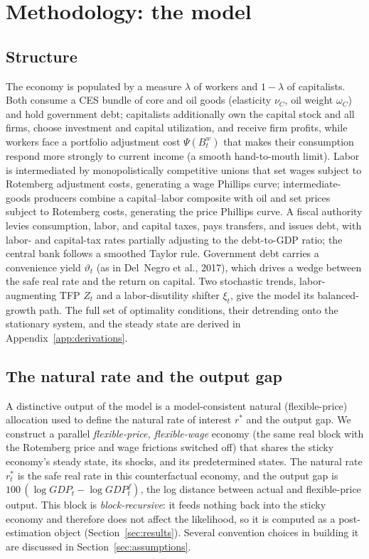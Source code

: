 \documentclass[11pt]{article}
\theoremstyle{definition}
\newcommand{\rstar}{r^{*}}
\begin{document}
\section{Methodology: the model}\label{sec:methodology}

\subsection{Structure}
The economy is populated by a measure $\lambda$ of workers and $1-\lambda$ of capitalists. Both
consume a CES bundle of core and oil goods (elasticity $\nu_C$, oil weight $\omega_C$) and hold
government debt; capitalists additionally own the capital stock and all firms, choose investment and
capital utilization, and receive firm profits, while workers face a portfolio adjustment cost
$\Psi(B^w_t)$ that makes their consumption respond more strongly to current income (a smooth
hand-to-mouth limit). Labor is intermediated by monopolistically competitive unions that set wages
subject to Rotemberg adjustment costs, generating a wage Phillips curve; intermediate-goods producers
combine a capital--labor composite with oil and set prices subject to Rotemberg costs, generating the
price Phillips curve. A fiscal authority levies consumption, labor, and capital taxes, pays transfers,
and issues debt, with labor- and capital-tax rates partially adjusting to the debt-to-GDP ratio; the
central bank follows a smoothed Taylor rule. Government debt carries a convenience yield $\vartheta_t$
(as in Del~Negro et al., 2017), which drives a wedge between the safe real rate and the return on
capital. Two stochastic trends, labor-augmenting TFP $Z_t$ and a labor-disutility shifter $\xi_t$,
give the model its balanced-growth path. The full set of optimality conditions, their detrending
onto the stationary system, and the steady state are derived in Appendix~\ref{app:derivations}.

\subsection{The natural rate and the output gap}
A distinctive output of the model is a model-consistent natural (flexible-price) allocation used to
define the natural rate of interest $\rstar$ and the output gap. We construct a parallel
\emph{flexible-price, flexible-wage} economy (the same real block with the Rotemberg price and wage
frictions switched off) that shares the sticky economy's steady state, its shocks, and its
predetermined states. The natural rate $\rstar_t$ is the safe real rate in this counterfactual economy,
and the output gap is $100\,(\log GDP_t-\log GDP^{f}_t)$, the log distance between actual and
flexible-price output. This block is \emph{block-recursive}: it feeds nothing back into the sticky
economy and therefore does not affect the likelihood, so it is computed as a post-estimation object
(Section~\ref{sec:results}). Several convention choices in building it are discussed in
Section~\ref{sec:assumptions}.
\end{document}
